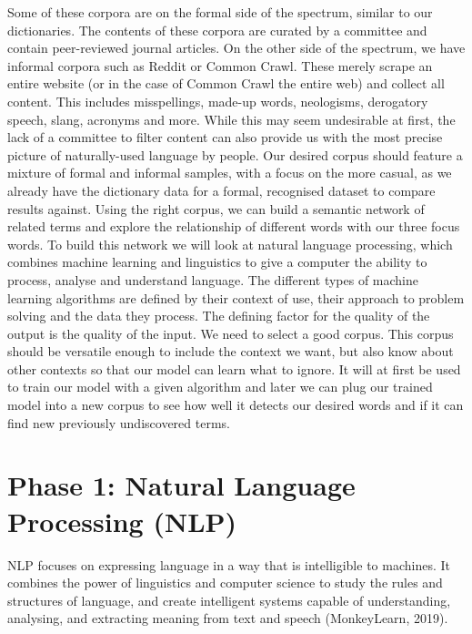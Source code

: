 \documentclass[12pt, usenames, dvipsnames]{report}
\begin{document}
\begin{flushleft}
Some of these corpora are on the formal side of the spectrum, similar to our dictionaries.
The contents of these corpora are curated by a committee and contain peer-reviewed journal articles.
On the other side of the spectrum, we have informal corpora such as Reddit or Common Crawl.
These merely scrape an entire website (or in the case of Common Crawl the entire web) and collect all content.
This includes misspellings, made-up words, neologisms, derogatory speech, slang, acronyms and more.
While this may seem undesirable at first, the lack of a committee to filter content can also provide us with the most precise picture of naturally-used language by people.
Our desired corpus should feature a mixture of formal and informal samples, with a focus on the more casual, as we already have the dictionary data for a formal, recognised dataset to compare results against.
Using the right corpus, we can build a semantic network of related terms and explore the relationship of different words with our three focus words.
To build this network we will look at natural language processing, which combines machine learning and linguistics to give a computer the ability to process, analyse and understand language.
The different types of machine learning algorithms are defined by their context of use, their approach to problem solving and the data they process.
The defining factor for the quality of the output is the quality of the input.
We need to select
a good corpus. This corpus should be versatile enough to include the context we want, but also know about other contexts so that our model can learn what to ignore.
It will at first be used to train our model with a given algorithm and later we can plug our trained model into a new corpus to see how well it detects our desired words and if it can find new previously undiscovered terms.


\chapter{Phase 1: Natural Language Processing (NLP)}

NLP focuses on expressing language in a way that is intelligible to machines.
It combines the power of linguistics and computer science to study the rules and structures of language, and create intelligent systems capable of understanding, analysing, and extracting meaning from text and speech (MonkeyLearn, 2019)\cite{monkeylearn2019}.


\end{flushleft}
\end{document}
